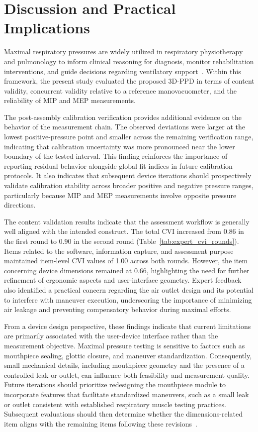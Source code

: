\documentclass{ieeeaccess}
\begin{document}
\section{Discussion and Practical Implications}
\label{sec:discussion}

Maximal respiratory pressures are widely utilized in respiratory physiotherapy and pulmonology to inform clinical reasoning for diagnosis, monitor rehabilitation interventions, and guide decisions regarding ventilatory support~\cite{Silveira2024Reliability}. Within this framework, the present study evaluated the proposed 3D-PPD in terms of content validity, concurrent validity relative to a reference manovacuometer, and the reliability of MIP and MEP measurements.

{The post-assembly calibration verification provides additional evidence on the behavior of the measurement chain. The observed deviations were larger at the lowest positive-pressure point and smaller across the remaining verification range, indicating that calibration uncertainty was more pronounced near the lower boundary of the tested interval. This finding reinforces the importance of reporting residual behavior alongside global fit indices in future calibration protocols. It also indicates that subsequent device iterations should prospectively validate calibration stability across broader positive and negative pressure ranges, particularly because MIP and MEP measurements involve opposite pressure directions.}

The content validation results indicate that the assessment workflow is generally well aligned with the intended construct. The total CVI increased from 0.86 in the first round to 0.90 in the second round (Table~\ref{tab:expert_cvi_rounds}). Items related to the software, information capture, and assessment purpose maintained item-level CVI values of 1.00 across both rounds. However, the item concerning device dimensions remained at 0.66, highlighting the need for further refinement of ergonomic aspects and user-interface geometry. Expert feedback also identified a practical concern regarding the air outlet design and its potential to interfere with maneuver execution, underscoring the importance of minimizing air leakage and preventing compensatory behavior during maximal efforts.

From a device design perspective, these findings indicate that current limitations are primarily associated with the user-device interface rather than the measurement objective. Maximal pressure testing is sensitive to factors such as mouthpiece sealing, glottic closure, and maneuver standardization. Consequently, small mechanical details, including mouthpiece geometry and the presence of a controlled leak or outlet, can influence both feasibility and measurement quality. Future iterations should prioritize redesigning the mouthpiece module to incorporate features that facilitate standardized maneuvers, such as a small leak or outlet consistent with established respiratory muscle testing practices. Subsequent evaluations should then determine whether the dimensions-related item aligns with the remaining items following these revisions~\cite{ATS2002,silveiraNewMethodMaximalPressures2021}.
\end{document}
